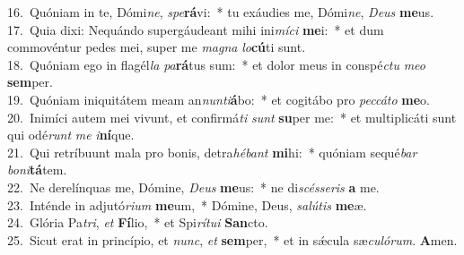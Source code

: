 {16.~}Quóniam in te, Dómi\textit{ne}, \textit{spe}\textbf{rá}vi:~* tu exáudies me, Dómi\textit{ne}, \textit{De}\textit{us} \textbf{me}us.\\
{17.~}Quia dixi: Nequándo supergáudeant mihi ini\textit{mí}\textit{ci} \textbf{me}i:~* et dum commovéntur pedes mei, super me \textit{ma}\textit{gna} \textit{lo}\textbf{cú}ti sunt.\\
{18.~}Quóniam ego in flagél\textit{la} \textit{pa}\textbf{rá}tus sum:~* et dolor meus in conspé\textit{ctu} \textit{me}\textit{o} \textbf{sem}per.\\
{19.~}Quóniam iniquitátem meam an\textit{nun}\textit{ti}\textbf{á}bo:~* et cogitábo pro \textit{pec}\textit{cá}\textit{to} \textbf{me}o.\\
{20.~}Inimíci autem mei vivunt, et confirmá\textit{ti} \textit{sunt} \textbf{su}per me:~* et multiplicáti sunt qui odé\textit{runt} \textit{me} \textit{i}\textbf{ní}que.\\
{21.~}Qui retríbuunt mala pro bonis, detra\textit{hé}\textit{bant} \textbf{mi}hi:~* quóniam sequé\textit{bar} \textit{bo}\textit{ni}\textbf{tá}tem.\\
{22.~}Ne derelínquas me, Dómine, \textit{De}\textit{us} \textbf{me}us:~* ne di\textit{scés}\textit{se}\textit{ris} \textbf{a} me.\\
{23.~}Inténde in adjutó\textit{ri}\textit{um} \textbf{me}um,~* Dómine, Deus, \textit{sa}\textit{lú}\textit{tis} \textbf{me}æ.\\
{24.~}Glória Pa\textit{tri}, \textit{et} \textbf{Fí}lio,~* et Spi\textit{rí}\textit{tu}\textit{i} \textbf{San}cto.\\
{25.~}Sicut erat in princípio, et \textit{nunc}, \textit{et} \textbf{sem}per,~* et in sǽcula sæ\textit{cu}\textit{ló}\textit{rum}. \textbf{A}men.\\
